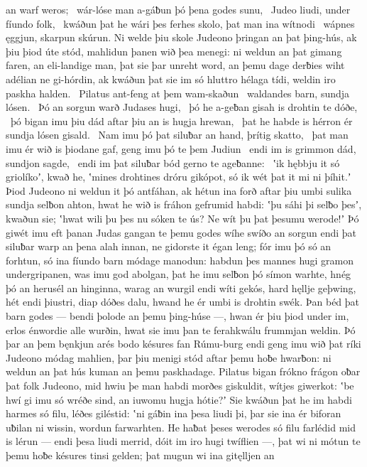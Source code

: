 an warf weros; \hld\ wár-lóse man
a-gáƀun þó þena godes sunu, \hld\ Judeo liudi,
under fíundo folk, \hld\ kwáðun þat he wári þes ferhes skolo,
þat man ina wítnodi \hld\ wápnes ęggjun,
skarpun skúrun. Ni welde þiu skole Judeono
þringan an þat þing-hús, ak þiu þiod úte stód,
mahlidun þanen wið þea menegi: ni weldun an þat gimang faren,
an eli-landige man, þat sie þar unreht word,
an þemu dage derƀies wiht adélian ne gi-hórdin,
ak kwáðun þat sie im só hluttro hélaga tídi,
weldin iro paskha halden. \hld\ Pilatus ant-feng
at þem wam-skaðun \hld\ waldandes barn,
sundja lósen. \hld\ Þó an sorgun warð
Judases hugi, \hld\ þó he a-geƀan gisah
is drohtin te dóðe, \hld\ þó bigan imu þiu dád aftar þiu
an is hugja hrewan, \hld\ þat he habde is hérron ér
sundja lósen gisald. \hld\ Nam imu þó þat siluƀar an hand,
þrítig skatto, \hld\ þat man imu ér wið is þiodane gaf,
geng imu þó te þem Judiun \hld\ endi im is grimmon dád,
sundjon sagde, \hld\ endi im þat siluƀar bód
gerno te ageƀanne: \hld\ ʽik hębbju it só griolíkoʼ, kwað he,
ʽmines drohtines dróru gikópot,
só ik wét þat it mi ni þíhit.ʼ Þiod Judeono
ni weldun it þó antfáhan, ak hétun ina forð aftar þiu
umbi sulika sundja selƀon ahton,
hwat he wið is fráhon gefrumid habdi:
ʽþu sáhi þi selƀo þesʼ, kwaðun sie; ʽhwat wili þu þes nu sóken te ús?
Ne wít þu þat þesumu werode!ʼ Þó giwét imu eft þanan
Judas gangan te þemu godes wíhe
swíðo an sorgun endi þat siluƀar warp
an þena alah innan, ne gidorste it égan leng;
fór imu þó só an forhtun, só ina fíundo barn
módage manodun: habdun þes mannes hugi
gramon undergripanen, was imu god abolgan,
þat he imu selƀon þó símon warhte,
hnég þó an herusél an hinginna,
warag an wurgil endi wíti gekós,
hard hęllje geþwing, hét endi þiustri,
diap dóðes dalu, hwand he ér umbi is drohtin swék.
Þan béd þat barn godes — bendi þolode
an þemu þing-húse —, hwan ér þiu þiod under im,
erlos énwordie alle wurðin,
hwat sie imu þan te ferahkwálu frummjan weldin.
Þó þar an þem bęnkjun arés bodo késures
fan Rúmu-burg endi geng imu wið þat ríki Judeono
módag mahlien, þar þiu menigi stód
aftar þemu hoƀe hwarƀon: ni weldun an þat hús kuman
an þemu paskhadage. Pilatus bigan
frókno frágon oƀar þat folk Judeono,
mid hwiu þe man habdi morðes giskuldit,
wítjes giwerkot: ʽbe hwí gi imu só wréðe sind,
an iuwomu hugja hótie?ʼ Sie kwáðun þat he im habdi harmes só filu,
léðes giléstid: ʽni gáƀin ina þesa liudi þi,
þar sie ina ér biforan uƀilan ni wissin,
wordun farwarhten. He haƀat þeses werodes só filu
farlédid mid is lérun — endi þesa liudi merrid,
dóit im iro hugi twíflien —, þat wi ni mótun te þemu hoƀe késures
tinsi gelden; þat mugun wi ina gitęlljen an
